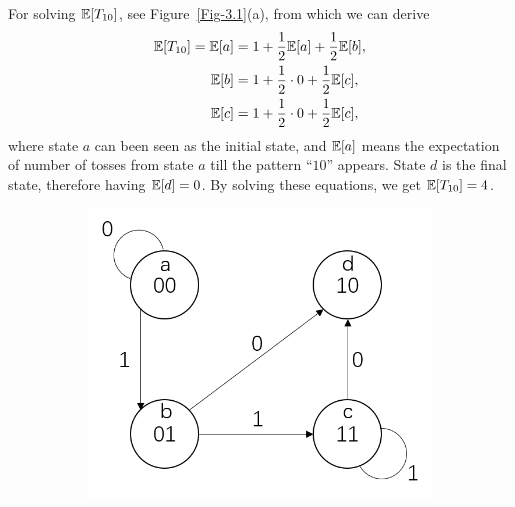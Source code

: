 \documentclass[12pt,a4]{article}
\begin{document}
\begin{solution}
\begin{enumerate}
         For solving $\mathbb{E}[T_{10}]$, see Figure~\ref{Fig-3.1}(a), from which we can derive
         \begin{align*}
            \mathbb{E}[T_{10}]=\mathbb{E}[a]&=1+\frac{1}{2}\mathbb{E}[a]+\frac{1}{2}\mathbb{E}[b],\\
            \mathbb{E}[b]&=1+\frac{1}{2}\cdot0+\frac{1}{2}\mathbb{E}[c],\\
            \mathbb{E}[c]&=1+\frac{1}{2}\cdot0+\frac{1}{2}\mathbb{E}[c],
         \end{align*}
         where state $a$ can been seen as the initial state, and $\mathbb{E}[a]$ means the expectation of number of tosses from state $a$ till the pattern ``$10$'' appears. State $d$ is the final state, therefore having $\mathbb{E}[d]=0$. By solving these equations, we get $\mathbb{E}[T_{10}]=4$.
        \begin{figure}[htbp]
         \captionsetup{skip=2pt}
         \vspace{0pt}
         \begin{subfigure}{.5\textwidth}
             \centering
             \includegraphics[width=\textwidth]{figures/Fig-3-1a.PNG}
             \caption{}
         \end{subfigure}
         \begin{subfigure}{.5\textwidth}
             \centering

\end{subfigure}
\end{figure}
\end{enumerate}
\end{solution}
\end{document}
